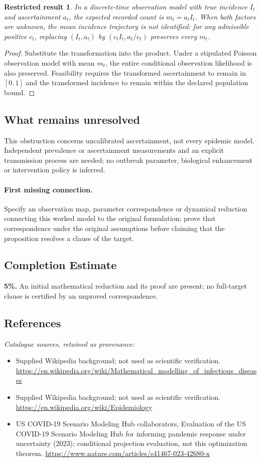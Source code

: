 \documentclass[11pt]{article}
\newtheorem{attemptresult}{Restricted result}[section]
\begin{document}
\begin{attemptresult}
In a discrete-time observation model with true incidence $I_t$ and ascertainment $a_t$, the expected recorded count is $m_t=a_tI_t$. When both factors are unknown, the mean incidence trajectory is not identified: for any admissible positive $c_t$, replacing $(I_t,a_t)$ by $(c_tI_t,a_t/c_t)$ preserves every $m_t$.
\end{attemptresult}
\begin{proof}
Substitute the transformation into the product. Under a stipulated Poisson observation model with mean $m_t$, the entire conditional observation likelihood is also preserved. Feasibility requires the transformed ascertainment to remain in $[0,1]$ and the transformed incidence to remain within the declared population bound.
\end{proof}
\subsection{What remains unresolved}
This obstruction concerns uncalibrated ascertainment, not every epidemic model. Independent prevalence or ascertainment measurements and an explicit transmission process are needed; no outbreak parameter, biological enhancement or intervention policy is inferred.
\paragraph{First missing connection.} Specify an observation map, parameter correspondence or dynamical reduction connecting this worked model to the original formulation; prove that correspondence under the original assumptions before claiming that the proposition resolves a clause of the target.
\subsection{Completion Estimate}
\textbf{5\%.} An initial mathematical reduction and its proof are present; no full-target clause is certified by an unproved correspondence.
\subsection{References}
\noindent\emph{Catalogue sources, retained as provenance:}
\begin{itemize}
\item Supplied Wikipedia background; not used as scientific verification. \url{https://en.wikipedia.org/wiki/Mathematical_modelling_of_infectious_diseases}
\item Supplied Wikipedia background; not used as scientific verification. \url{https://en.wikipedia.org/wiki/Epidemiology}
\item US COVID-19 Scenario Modeling Hub collaborators, Evaluation of the US COVID-19 Scenario Modeling Hub for informing pandemic response under uncertainty (2023); conditional projection evaluation, not this optimization theorem. \url{https://www.nature.com/articles/s41467-023-42680-x}
\end{itemize}
\clearpage
\end{document}
